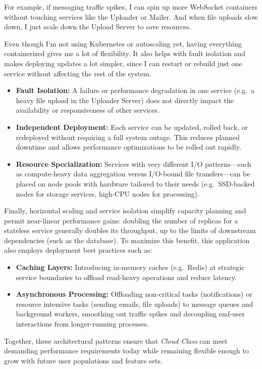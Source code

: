 For example, if messaging traffic spikes, I can spin up more WebSocket containers without touching services like the Uploader or Mailer. And when file uploads slow down, I just scale down the Upload Server to save resources.

Even though I'm not using Kubernetes or autoscaling yet, having everything containerized gives me a lot of flexibility. It also helps with fault isolation and makes deploying updates a lot simpler, since I can restart or rebuild just one service without affecting the rest of the system.

\begin{itemize}
  \item \textbf{Fault Isolation:}  A failure or performance degradation in one service (e.g.\ a heavy file upload in the Uploader Server) does not directly impact the availability or responsiveness of other services.
  \item \textbf{Independent Deployment:}  Each service can be updated, rolled back, or redeployed without requiring a full system outage.  This reduces planned downtime and allows performance optimizations to be rolled out rapidly.
  \item \textbf{Resource Specialization:}  Services with very different I/O patterns—such as compute-heavy data aggregation versus I/O-bound file transfers—can be placed on node pools with hardware tailored to their needs (e.g.\ SSD-backed nodes for storage services, high-CPU nodes for processing).
\end{itemize}

Finally, horizontal scaling and service isolation simplify capacity planning and permit near-linear performance gains: doubling the number of replicas for a stateless service generally doubles its throughput, up to the limits of downstream dependencies (such as the database).  To maximize this benefit, this application also employs deployment best practices such as:

\begin{itemize}
  \item \textbf{Caching Layers:} Introducing in-memory caches (e.g.\ Redis) at strategic service boundaries to offload read-heavy operations and reduce latency.
  \item \textbf{Asynchronous Processing:} Offloading non-critical tasks (notifications) or resource intensive tasks (sending emails, file uploads) to message queues and background workers, smoothing out traffic spikes and decoupling end-user interactions from longer-running processes.
\end{itemize}

Together, these architectural patterns ensure that \emph{Cloud Class} can meet demanding performance requirements today while remaining flexible enough to grow with future user populations and feature sets.


